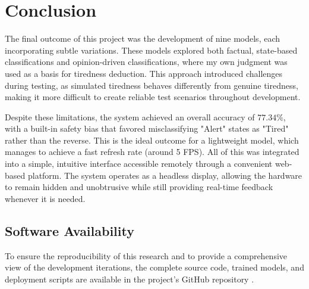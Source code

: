\chapter*{Conclusion}

The final outcome of this project was the development of nine models, each incorporating subtle variations. These
models explored both factual, state-based classifications and opinion-driven classifications, where my own
judgment was used as a basis for tiredness deduction. This approach introduced challenges during testing, as
simulated tiredness behaves differently from genuine tiredness, making it more difficult to create reliable
test scenarios throughout development.

Despite these limitations, the system achieved an overall accuracy of $77.34\%$, with a built-in safety bias
that favored misclassifying "Alert" states as "Tired" rather than the reverse. This is the ideal outcome for a
lightweight model, which manages to achieve a fast refresh rate (around 5 FPS). All of this was integrated
into a simple, intuitive interface accessible remotely through a convenient web-based platform. The system
operates as a headless display, allowing the hardware to remain hidden and unobtrusive while still providing
real-time feedback whenever it is needed.

\section*{Software Availability}
To ensure the reproducibility of this research and to provide a comprehensive view of the development
iterations, the complete source code, trained models, and deployment scripts are available in the project's
GitHub repository \cite{project_repo}.